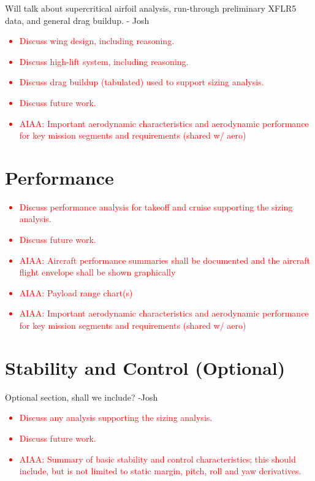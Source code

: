 \documentclass[conf]{new-aiaa}
\begin{document}
Will talk about supercritical airfoil analysis, run-through preliminary XFLR5 data, and general drag buildup. - Josh
\textcolor{red}{
\begin{itemize}
    \item Discuss wing design, including reasoning.
    \item Discuss high-lift system, including reasoning.
    \item Discuss drag buildup (tabulated) used to support sizing analysis.
    \item Discuss future work.
    \item AIAA: Important aerodynamic characteristics and aerodynamic performance for key mission
    segments and requirements (shared w/ aero)
\end{itemize}}

\section{Performance}
\textcolor{red}{
\begin{itemize}
    \item Discuss performance analysis for takeoff and cruise supporting the sizing analysis.
    \item Discuss future work.
    \item AIAA: Aircraft performance summaries shall be documented and the aircraft flight envelope
    shall be shown graphically
    \item AIAA: Payload range chart(s)
    \item AIAA: Important aerodynamic characteristics and aerodynamic performance for key mission
    segments and requirements (shared w/ aero)
\end{itemize}}

\section{Stability and Control (Optional)}
Optional section, shall we include? -Josh
\textcolor{red}{
\begin{itemize}
    \item Discuss any analysis supporting the sizing analysis.
    \item Discuss future work.
    \item AIAA: Summary of basic stability and control characteristics; this should include, but is not
    limited to static margin, pitch, roll and yaw derivatives.
\end{itemize}}
\end{document}
